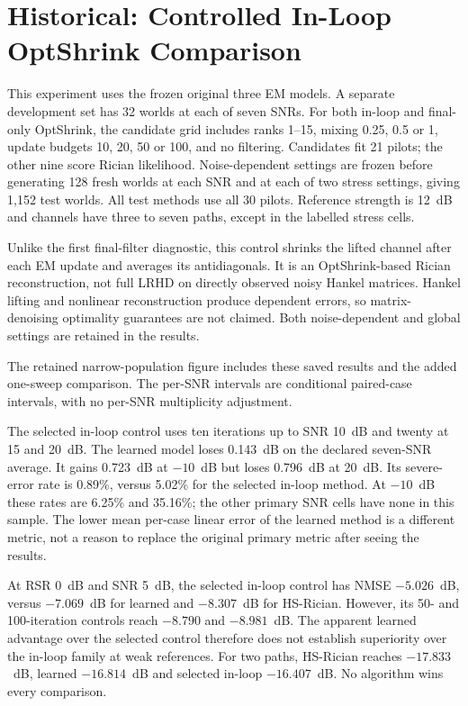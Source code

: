 \section{Historical: Controlled In-Loop OptShrink Comparison}
This experiment uses the frozen original three EM models. A separate
development set has 32 worlds at each of seven SNRs. For both in-loop and
final-only OptShrink, the candidate grid includes ranks 1--15, mixing
0.25, 0.5 or 1, update budgets 10, 20, 50 or 100, and no filtering.
Candidates fit 21 pilots; the other nine score Rician likelihood.
Noise-dependent settings are frozen before generating 128 fresh worlds
at each SNR and at each of two stress settings, giving 1,152 test worlds.
All test methods use all 30 pilots. Reference strength is 12~dB and
channels have three to seven paths, except in the labelled stress cells.

Unlike the first final-filter diagnostic, this control shrinks the lifted
channel after each EM update and averages its antidiagonals. It is an
OptShrink-based Rician reconstruction, not full LRHD on directly observed
noisy Hankel matrices. Hankel lifting and nonlinear reconstruction produce
dependent errors, so matrix-denoising optimality guarantees are not claimed.
Both noise-dependent and global settings are retained in the results.

The retained narrow-population figure includes these saved results
and the added one-sweep comparison. The per-SNR intervals are conditional
paired-case intervals, with no per-SNR multiplicity adjustment.

The selected in-loop control uses ten iterations up to SNR 10~dB and
twenty at 15 and 20~dB. The learned model loses 0.143~dB on the declared
seven-SNR average. It gains 0.723~dB at $-10$~dB but loses 0.796~dB at
20~dB. Its severe-error rate is 0.89\%, versus 5.02\% for the selected
in-loop method. At $-10$~dB these rates are 6.25\% and 35.16\%; the
other primary SNR cells have none in this sample. The lower mean per-case
linear error of the learned method is a different metric, not a reason
to replace the original primary metric after seeing the results.

At RSR 0~dB and SNR 5~dB, the selected in-loop control has NMSE
$-5.026$~dB, versus $-7.069$~dB for learned and $-8.307$~dB for HS-Rician.
However, its 50- and 100-iteration controls reach $-8.790$ and $-8.981$~dB.
The apparent learned advantage over the selected control therefore does
not establish superiority over the in-loop family at weak references.
For two paths, HS-Rician reaches $-17.833$~dB, learned $-16.814$~dB and
selected in-loop $-16.407$~dB. No algorithm wins every comparison.

